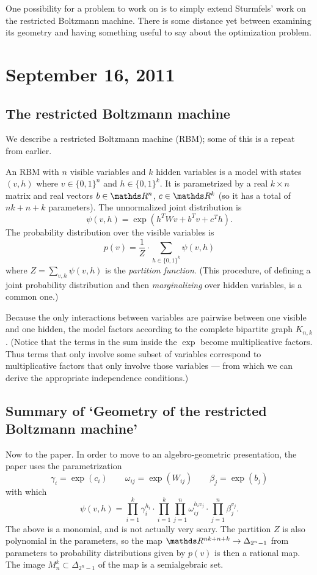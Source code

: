\documentclass[11pt]{article}
\begin{document}
One possibility for a problem to work on is to simply extend Sturmfels' work on
the restricted Boltzmann machine.  There is some distance yet between examining
its geometry and having something useful to say about the optimization problem.

\section{September 16, 2011}


\subsection{The restricted Boltzmann machine}

We describe a restricted Boltzmann machine (RBM); some of this is a repeat from
earlier.

An RBM with $n$ visible variables and $k$ hidden variables is a model with
states $(v, h)$ where $v \in \{0,1\}^n$ and $h \in \{0,1\}^k$.  It is
parametrized by a real $k \times n$ matrix and real vectors $b \in \R^n$, $c \in
\R^k$ (so it has a total of $nk + n + k$ parameters).  The unnormalized joint
distribution is
\[
    \psi(v, h) = \exp(h^T W v + b^Tv + c^T h).
\]
The probability distribution over the visible variables is 
\[
    p(v) = \frac 1 Z \cdot \sum_{h \in \{0,1\}^k} \psi(v, h)
\]
where $Z = \sum_{v,h} \psi(v, h)$ is the \emph{partition function}.  (This
procedure, of defining a joint probability distribution and then
\emph{marginalizing} over hidden variables, is a common one.)

Because the only interactions between variables are pairwise between one visible
and one hidden, the model factors according to the complete bipartite graph
$K_{n,k}$.  (Notice that the terms in the sum inside the $\exp$ become
multiplicative factors.  Thus terms that only involve some subset of variables
correspond to multiplicative factors that only involve those variables --- from
which we can derive the appropriate independence conditions.)

\subsection{Summary of `Geometry of the restricted Boltzmann machine'}

Now to the paper.  In order to move to an algebro-geometric presentation, the
paper uses the parametrization
\[
    \gamma_i = \exp(c_i)
    \qquad
    \omega_{ij} = \exp(W_{ij})
    \qquad
    \beta_j = \exp(b_j)
\]
with which
\[
    \psi(v, h) = \prod_{i=1}^k \gamma_i^{h_i}
        \cdot 
        \prod_{i=1}^k \prod_{j=1}^n \omega_{ij}^{h_i v_j}
        \cdot
        \prod_{j=1}^n \beta_j^{v_j}.
\]
The above is a monomial, and is not actually very scary.  The partition $Z$ is
also polynomial in the parameters, so the map $\R^{nk+n+k} \to
\Delta_{2^n-1}$ from parameters to probability distributions given by $p(v)$ is
then a rational map.  The image $M_n^k \subset \Delta_{2^n - 1}$ of the map is a
semialgebraic set.
\end{document}
